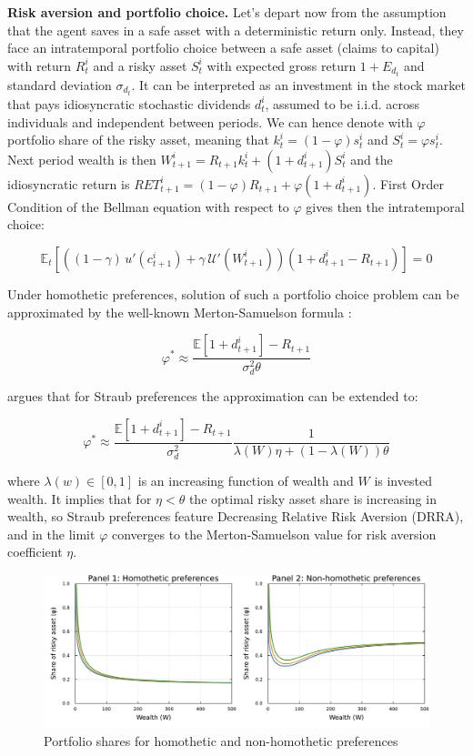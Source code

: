 \documentclass[12pt]{article}
\begin{document}
\textbf{Risk aversion and portfolio choice.} Let's depart now from the assumption that the agent saves in a safe asset with a deterministic return only. Instead, they face an intratemporal portfolio choice between a safe asset (claims to capital) with return $R_t^i$ and a risky asset $S_t^i$ with expected gross return $1 + E_{d_t}$ and standard deviation $\sigma_{d_t}$. It can be interpreted as an investment in the stock market that pays idiosyncratic stochastic dividends $d_t^i$, assumed to be i.i.d. across individuals and independent between periods. We can hence denote with $\varphi$ portfolio share of the risky asset, meaning that $k_t^i=(1-\varphi) s_t^i$ and $S_t^i=\varphi s_t^i$. Next period wealth is then $W_{t+1}^i=R_{t+1}k_t^i + (1+d_{t+1}^i)S_t^i$ and the idiosyncratic return is $RET_{t+1}^i=(1-\varphi) R_{t+1} + \varphi(1+d_{t+1}^i)$. First Order Condition of the Bellman equation with respect to $\varphi$ gives then the intratemporal choice:


\[
\mathbb{E}_t \left[ 
\left( (1 - \gamma) \, u'\left(c_{t+1}^i\right) 
+ \gamma \, \mathcal{U}'\left(W_{t+1}^i\right) \right)
\left(1 + d_{t+1}^i - R_{t+1} \right) 
\right] = 0
\]

Under homothetic preferences, solution of such a portfolio choice problem can be approximated by the well-known Merton-Samuelson formula \parencite{samuelson1969, merton1969}:

\[
\varphi^* \approx \frac{\mathbb{E}[1 + d_{t+1}^i] - R_{t+1}}{\sigma_d^2 \theta}
\]

\textcite{mijakovic2024} argues that for Straub preferences the approximation can be extended to:

\[
\varphi^* \approx \frac{\mathbb{E}[1 + d_{t+1}^i] - R_{t+1}}{\sigma_d^2} \frac{1}{\lambda(W) \eta + (1 - \lambda(W)) \theta}
\]

where $\lambda(w) \in [0,1]$ is an increasing function of wealth and $W$ is invested wealth. It implies that for $\eta<\theta$ the optimal risky asset share is increasing in wealth, so Straub preferences feature Decreasing Relative Risk Aversion (DRRA), and in the limit $\varphi$ converges to the Merton-Samuelson value for risk aversion coefficient $\eta$.

\begin{figure}[h]
    \centering
    \includegraphics[width=1.0\textwidth]{figure_2.pdf}
    \caption{Portfolio shares for homothetic and non-homothetic preferences}
    \label{fig:risky_share}
\end{figure}
\end{document}
